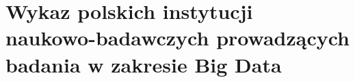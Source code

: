\section{Wykaz polskich instytucji naukowo-badawczych prowadzących badania w zakresie Big Data}
\label{sec:wykaz_polskich_instytucji_naukowo_badawczych_prowadz_cych_badania_w_zakresie_big_data}


